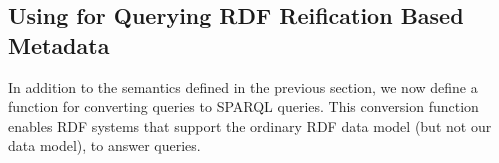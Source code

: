 % 
% 


\subsection{Using {\SPARQLplus} for Querying RDF Reification Based Metadata}

In addition to the {\SPARQLplus} semantics defined in the previous section, we now define
	a function for converting {\SPARQLplus} queries to SPARQL queries. This conversion function
enables RDF systems that support the ordinary RDF data model (but not our {\RDFplus} data model), to answer {\SPARQLplus} queries.


